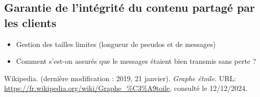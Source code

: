 \documentclass{article}
\begin{document}
\subsection{Garantie de l'intégrité du contenu partagé par les clients}
\begin{itemize}
    \item Gestion des tailles limites (longueur de pseudos et de messages)
    \item Comment s'est-on assurés que le messages étaient bien transmis sans perte ?
\end{itemize}


\begin{thebibliography}{999}
		Wikipedia. (dernière modification : 2019, 21 janvier). \textit{Graphe étoile.} URL: \url{https://fr.wikipedia.org/wiki/Graphe_%C3%A9toile}, consulté le 12/12/2024.
\end{thebibliography}
\end{document}
